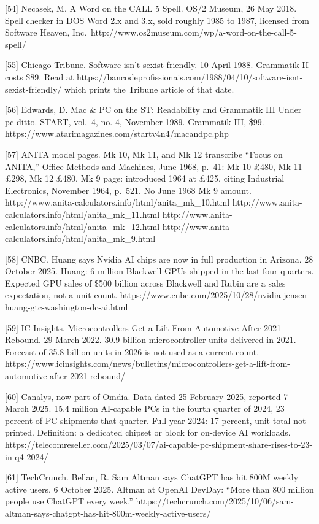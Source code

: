 \documentclass[
  10pt,
]{article}
\begin{document}
{[}54{]} Necasek, M. A Word on the CALL 5 Spell. OS/2 Museum, 26 May
2018. Spell checker in DOS Word 2.x and 3.x, sold roughly 1985 to 1987,
licensed from Software Heaven,
Inc.~http://www.os2museum.com/wp/a-word-on-the-call-5-spell/

{[}55{]} Chicago Tribune. Software isn't sexist friendly. 10 April 1988.
Grammatik II costs \$89. Read at
https://bancodeprofissionais.com/1988/04/10/software-isnt-sexist-friendly/
which prints the Tribune article of that date.

{[}56{]} Edwards, D. Mac \& PC on the ST: Readability and Grammatik III
Under pc-ditto. START, vol.~4, no. 4, November 1989. Grammatik III,
\$99. https://www.atarimagazines.com/startv4n4/macandpc.php

{[}57{]} ANITA model pages. Mk 10, Mk 11, and Mk 12 transcribe ``Focus
on ANITA,'' Office Methods and Machines, June 1968, p.~41: Mk 10 £480,
Mk 11 £298, Mk 12 £480. Mk 9 page: introduced 1964 at £425, citing
Industrial Electronics, November 1964, p.~521. No June 1968 Mk 9 amount.
http://www.anita-calculators.info/html/anita\_mk\_10.html
http://www.anita-calculators.info/html/anita\_mk\_11.html
http://www.anita-calculators.info/html/anita\_mk\_12.html
http://www.anita-calculators.info/html/anita\_mk\_9.html

{[}58{]} CNBC. Huang says Nvidia AI chips are now in full production in
Arizona. 28 October 2025. Huang: 6 million Blackwell GPUs shipped in the
last four quarters. Expected GPU sales of \$500 billion across Blackwell
and Rubin are a sales expectation, not a unit count.
https://www.cnbc.com/2025/10/28/nvidia-jensen-huang-gtc-washington-dc-ai.html

{[}59{]} IC Insights. Microcontrollers Get a Lift From Automotive After
2021 Rebound. 29 March 2022. 30.9 billion microcontroller units
delivered in 2021. Forecast of 35.8 billion units in 2026 is not used as
a current count.
https://www.icinsights.com/news/bulletins/microcontrollers-get-a-lift-from-automotive-after-2021-rebound/

{[}60{]} Canalys, now part of Omdia. Data dated 25 February 2025,
reported 7 March 2025. 15.4 million AI-capable PCs in the fourth quarter
of 2024, 23 percent of PC shipments that quarter. Full year 2024: 17
percent, unit total not printed. Definition: a dedicated chipset or
block for on-device AI workloads.
https://telecomreseller.com/2025/03/07/ai-capable-pc-shipment-share-rises-to-23-in-q4-2024/

{[}61{]} TechCrunch. Bellan, R. Sam Altman says ChatGPT has hit 800M
weekly active users. 6 October 2025. Altman at OpenAI DevDay: ``More
than 800 million people use ChatGPT every week.''
https://techcrunch.com/2025/10/06/sam-altman-says-chatgpt-has-hit-800m-weekly-active-users/
\end{document}
